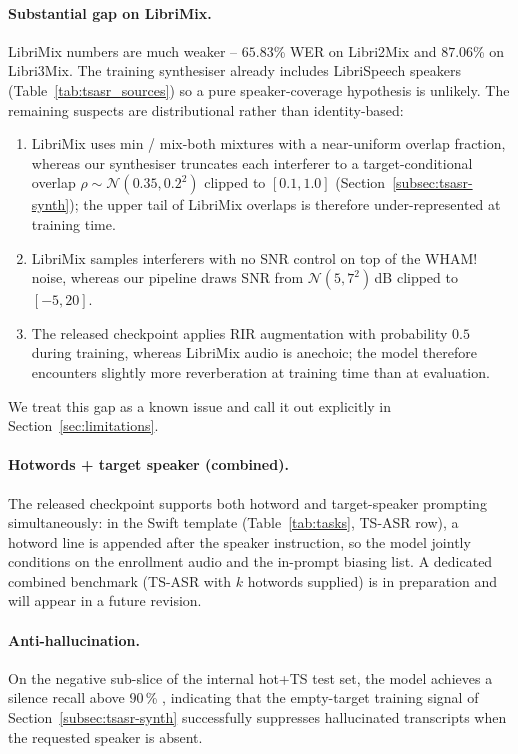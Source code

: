 \paragraph{Substantial gap on LibriMix.}
LibriMix numbers are much weaker -- $65.83$\% WER on Libri2Mix and
$87.06$\% on Libri3Mix. The training synthesiser already includes
LibriSpeech speakers (Table~\ref{tab:tsasr_sources}) so a pure
speaker-coverage hypothesis is unlikely. The remaining suspects are
distributional rather than identity-based:
\begin{enumerate}
  \item LibriMix uses min / mix-both mixtures with a near-uniform
        overlap fraction, whereas our synthesiser truncates each
        interferer to a target-conditional overlap
        $\rho\!\sim\!\mathcal{N}(0.35, 0.2^2)$ clipped to $[0.1, 1.0]$
        (Section~\ref{subsec:tsasr-synth}); the upper tail of LibriMix
        overlaps is therefore under-represented at training time.
  \item LibriMix samples interferers with no SNR control on top of
        the WHAM! noise, whereas our pipeline draws SNR from
        $\mathcal{N}(5, 7^2)$\,dB clipped to $[-5, 20]$.
  \item The released checkpoint applies RIR augmentation with
        probability $0.5$ during training, whereas LibriMix audio is
        anechoic; the model therefore encounters slightly more
        reverberation at training time than at evaluation.
\end{enumerate}
We treat this gap as a known issue and call it out explicitly in
Section~\ref{sec:limitations}.

\paragraph{Hotwords + target speaker (combined).}
The released checkpoint supports both hotword and target-speaker
prompting simultaneously: in the Swift template
(Table~\ref{tab:tasks}, TS-ASR row), a hotword line is appended after
the speaker instruction, so the model jointly conditions on the
enrollment audio and the in-prompt biasing list. A dedicated combined
benchmark (TS-ASR with $k$ hotwords supplied) is in preparation and
will appear in a future revision.

\paragraph{Anti-hallucination.}
On the negative sub-slice of the internal hot+TS test set, the model
achieves a silence recall above $90$\,\%
, indicating that the empty-target training signal of
Section~\ref{subsec:tsasr-synth} successfully suppresses hallucinated
transcripts when the requested speaker is absent.
